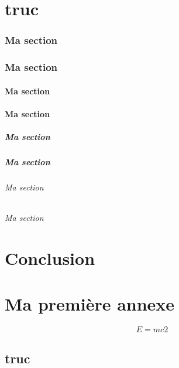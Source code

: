 \documentclass{polytech/polytech}
\begin{document}
\label{essai:chap2:sec}

  
\chapter{truc}
\lipsum[1-20]         
 
\subsection{Ma section}
\lipsum[1-5]           

\subsection{Ma section}
\lipsum[1-5]
\subsubsection{Ma section}
\lipsum[1-5]
\subsubsection{Ma section}
\lipsum[1-5]
\paragraph{Ma section}
\lipsum[1-5]
\paragraph{Ma section}
\lipsum[1-5]
\subparagraph{Ma section}
\lipsum[1-5]
\subparagraph{Ma section}
\lipsum[1-5]
  
\chapter*{Conclusion}

\appendix   

\chapter{Ma première annexe}

\label{ann:chap1}
        
\lipsum[1-4]

\begin{equation}
\label{eq:3}
E=mc2
\end{equation} 

\section{truc}
 
\end{document}
